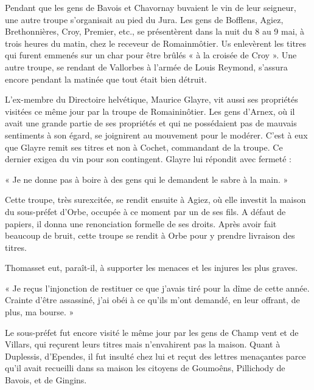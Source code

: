 \documentclass[french,twoside]{book} %
\newenvironment{quoteblock}%
  {\begin{quoting}}
  {\end{quoting}}
\newenvironment{quotebar}{%
    \def\FrameCommand{{\color{rubric!10!}\vrule width 0.5em} \hspace{0.9em}}%
    \def\OuterFrameSep{\itemsep} %
    \MakeFramed {\advance\hsize-\width \FrameRestore}
  }%
  {%
    \endMakeFramed
  }
\renewenvironment{quoteblock}%
  {%
    \savenotes
    \setstretch{0.9}
    \begin{quotebar}
  }
  {%
    \end{quotebar}
    \spewnotes
  }
\begin{document}
\noindent Pendant que les gens de Bavois et Chavornay buvaient le vin de leur seigneur, une autre troupe s’organisait au pied du Jura. Les gens de Bofflens, Agiez, Brethonnières, Croy, Premier, etc., se présentèrent dans la nuit du 8 au 9 mai, à trois heures du matin, chez le receveur de Romainmôtier. Us enlevèrent les titres qui furent emmenés sur un char pour être brûlés « à la croisée de Croy ». Une autre troupe, se rendant de Vallorbes à l’armée de Louis Reymond, s’assura encore pendant la matinée que tout était bien détruit.\par
L’ex-membre du Directoire helvétique, Maurice Glayre, vit aussi ses propriétés visitées ce même jour par la troupe de Romaininôtier. Les gens d’Arnex, où il avait une grande partie de ses propriétés et qui ne possédaient pas de mauvais sentiments à son égard, se joignirent au mouvement pour le modérer. C’est à eux que Glayre remit ses titres et non à Cochet, commandant de la troupe. Ce dernier exigea du vin pour son contingent. Glayre lui répondit avec fermeté :\par

\begin{quoteblock}
\noindent « Je ne donne pas à boire à des gens qui le demandent le sabre à la main. »\end{quoteblock}

\noindent Cette troupe, très surexcitée, se rendit ensuite à Agiez, où elle investit la maison du sous-préfet d’Orbe, occupée à ce moment par un de ses fils. A défaut de papiers, il donna une renonciation formelle de ses droits. Après avoir fait beaucoup de bruit, cette troupe se rendit à Orbe pour y prendre livraison des titres.\par
Thomasset eut, paraît-il, à supporter les menaces et les injures les plus graves.\par

\begin{quoteblock}
\noindent « Je reçus l’injonction de restituer ce que j’avais tiré pour la dîme de cette année. Crainte d’être assassiné, j’ai obéi à ce qu’ils m’ont demandé, en leur offrant, de plus, ma bourse. »\end{quoteblock}

\noindent Le sous-préfet fut encore visité le même jour par les gens de Champ vent et de Villars, qui reçurent leurs titres mais n’envahirent pas la maison. Quant à Duplessis, d’Ependes, il fut insulté chez lui et reçut des lettres menaçantes parce qu’il avait recueilli dans sa maison les citoyens de Goumoêns, Pillichody de Bavois, et de Gingins.\par
\end{document}
